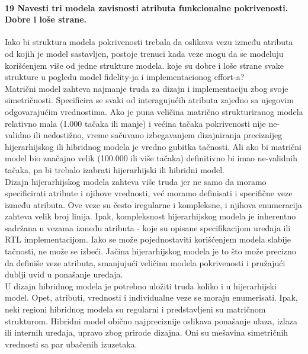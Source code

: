 \documentclass[a4paper, 12pt]{article}
\begin{document}
\paragraph{19 Navesti tri modela zavisnosti atributa funkcionalne pokrivenosti. Dobre i loše strane.}
\hfill \break
\indent Iako bi struktura modela pokrivenosti trebala da oslikava vezu između atributa od kojih je model sastavljen, postoje trenuci kada veze mogu da se modeluju korišćenjem više od jedne strukture modela. koje su dobre i loše strane svake strukture u pogledu model fidelity-ja i implementacionog effort-a?\\
\indent Matrični model zahteva najmanje truda za dizajn i implementaciju zbog svoje simetričnosti. Specificira se svaki od interagujućih atributa zajedno sa njegovim odgovarajućim vrednostima. Ako je puna veličina matrično strukturiranog modela relativno mala (1.000 tačaka ili manje) i većina tačaka pokrivenosti nije ne-validno ili nedostižno, vreme sačuvano izbegavanjem dizajniranja preciznijeg hijerarhijskog ili hibridnog modela je vredno gubitka tačnosti. Ali ako bi matrični model bio značajno velik (100.000 ili više tačaka) definitivno bi imao ne-validnih tačaka, pa bi trebalo izabrati hijerarhijski ili hibridni model.\\
\indent Dizajn hijerarhijskog modela zahteva više truda jer ne samo da moramo specificirati atribute i njihove vrednosti, već moramo definisati i specifične veze između atributa. Ove veze su često iregularne i kompleksne, i njihova enumeracija zahteva velik broj linija. Ipak, kompleksnost hijerarhijskog modela je inherentno sadržana u vezama između atributa - koje su opisane specifikacijom uređaja ili RTL implementacijom. Iako se može pojednostaviti korišćenjem modela slabije tačnosti, ne može se izbeći. Jačina hijerarhijskog modela je to što može precizno da definiše veze atributa, smanjujući veličinu modela pokrivenosti i pružajući dublji uvid u ponašanje uređaja.\\
\indent U dizajn hibridnog modela je potrebno uložiti truda koliko i u hijerarhijski model. Opet, atributi, vrednosti i individualne veze se moraju enumerisati. Ipak, neki regioni hibridnog modela su regularni i predstavljeni su matričnom strukturom. Hibridni model obično najpreciznije oslikava ponašanje ulaza, izlaza ili internih uređaja, upravo zbog prirode dizajna. Oni su mešavina simetričnih vrednosti sa par ubačenih izuzetaka.
\end{document}
